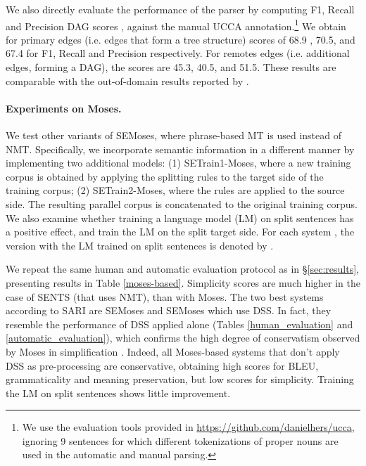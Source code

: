 \documentclass[11pt,a4paper]{article}
\begin{document}
We also directly evaluate the performance of the parser by computing F1, Recall and Precision DAG scores \citep{H17}, against the manual UCCA annotation.\footnote{We use the evaluation tools provided in \url{https://github.com/danielhers/ucca}, ignoring 9 sentences for which different tokenizations of proper nouns are used in the automatic and manual parsing.} We obtain for primary edges (i.e. edges that form a tree structure) scores of 68.9 , 70.5, and 67.4 for F1, Recall and Precision respectively. For remotes edges (i.e. additional edges, forming a DAG), the scores are 45.3, 40.5, and 51.5. These results are comparable with the  out-of-domain results reported by \citet{H17}.

\vspace{-0.2cm}
\paragraph{Experiments on Moses.}

We test other variants of SEMoses, where phrase-based MT is used instead of NMT.
Specifically, we incorporate semantic information in a different manner by implementing two additional models: 
(1) SETrain1-Moses, where a new training corpus is obtained by applying the splitting rules to the target 
side of the training corpus; (2) SETrain2-Moses, where the rules are applied to the source side. 
The resulting parallel corpus is concatenated to the original training corpus.
We also examine whether training a language model (LM) on split sentences has a positive effect,
and train the LM on the split target side.
For each system , the version with the LM trained on split sentences is denoted by .

We repeat the same human and automatic evaluation protocol as in \S\ref{sec:results},
presenting results in Table \ref{moses-based}. 
Simplicity scores are much higher in the case of SENTS (that uses NMT), than with Moses.
The two best systems according to SARI are SEMoses and SEMoses which use DSS. 
In fact, they resemble the performance of DSS applied alone (Tables \ref{human_evaluation} and \ref{automatic_evaluation}),
which confirms the high degree of conservatism observed by Moses in simplification \citep{AM17}.
Indeed, all Moses-based systems that don't apply DSS as
pre-processing are conservative, obtaining high scores for BLEU, grammaticality and meaning preservation,
but low scores for simplicity.
Training the LM on split sentences shows little improvement. 


\vspace{-0.2cm}
\end{document}
